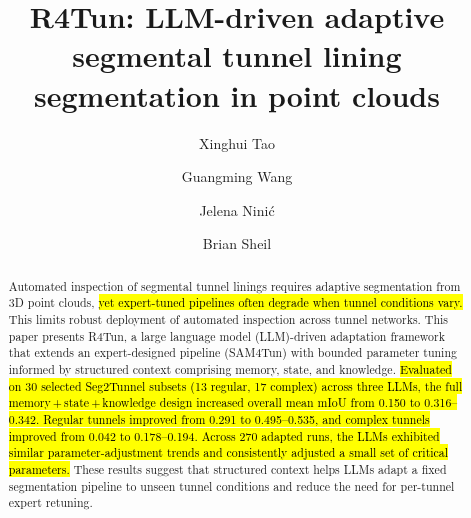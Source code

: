 \documentclass[a4paper,fleqn]{cas-dc}
\begin{document}
\let\WriteBookmarks\relax
\def\floatpagepagefraction{1}
\def\textpagefraction{.001}



\title[mode=title]{R4Tun: LLM-driven adaptive segmental tunnel lining segmentation in point clouds}

\author[1]{Xinghui Tao}

\author[1]{Guangming Wang}
\cormark[1]

\author[2]{Jelena Nini\'{c}}

\author[1]{Brian Sheil}





\begin{abstract}
Automated inspection of segmental tunnel linings requires adaptive segmentation from 3D point clouds, \hl{yet expert-tuned pipelines often degrade when tunnel conditions vary.} This limits robust deployment of automated inspection across tunnel networks. This paper presents R4Tun, a large language model (LLM)-driven adaptation framework that extends an expert-designed pipeline (SAM4Tun) with bounded parameter tuning informed by structured context comprising memory, state, and knowledge. \hl{Evaluated on 30 selected Seg2Tunnel subsets (13 regular, 17 complex) across three LLMs, the full memory\,+\,state\,+\,knowledge design increased overall mean mIoU from 0.150 to 0.316--0.342. Regular tunnels improved from 0.291 to 0.495--0.535, and complex tunnels improved from 0.042 to 0.178--0.194. Across 270 adapted runs, the LLMs exhibited similar parameter-adjustment trends and consistently adjusted a small set of critical parameters.} These results suggest that structured context helps LLMs adapt a fixed segmentation pipeline to unseen tunnel conditions and reduce the need for per-tunnel expert retuning.
\end{abstract}
\end{document}
